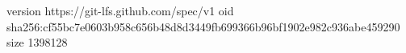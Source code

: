 version https://git-lfs.github.com/spec/v1
oid sha256:cf55bc7e0603b958c656b48d8d3449fb699366b96bf1902e982c936abe459290
size 1398128
